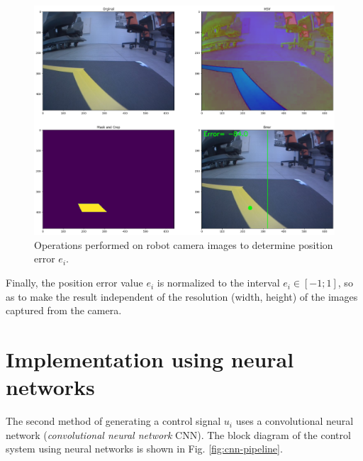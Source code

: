 \documentclass[conference]{IEEEtran}
\begin{document}
\begin{figure}[hbt!]
    \centering
    \includegraphics[width=.95\columnwidth]{img-transformation.png}
    \caption{Operations performed on robot camera images to determine position error  $e_i$.}
    \label{fig:img-transformation-summary}
\end{figure}

Finally, the position error value $e_i$ is normalized to the interval $e_i \in [-1;1]$, so as to make the result independent of the resolution (width, height) of the images captured from the camera.


\section{Implementation using neural networks}\label{sec:nn-controller}
The second method of generating a control signal $u_i$ uses a convolutional neural network (\emph{convolutional neural network} CNN). The block diagram of the control system using neural networks is shown in Fig. \ref{fig:cnn-pipeline}.
\end{document}
